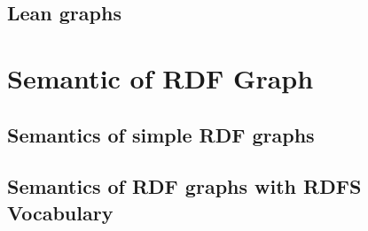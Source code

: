 \documentclass[10pt]{article}
\begin{document}
\subsection{Lean graphs}


\section{Semantic of RDF Graph}


\subsection{Semantics of simple RDF graphs}



\subsection{Semantics of RDF graphs with RDFS Vocabulary}


 







\end{document}
